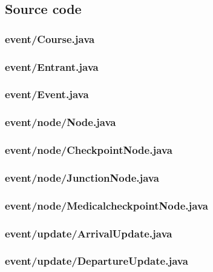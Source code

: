 \documentclass[a4paper, twoside]{article}
\begin{document}
\subsection{Source code}
\subsubsection{event/Course.java}

\subsubsection{event/Entrant.java}

\subsubsection{event/Event.java}

\subsubsection{event/node/Node.java}

\subsubsection{event/node/CheckpointNode.java}

\subsubsection{event/node/JunctionNode.java}

\subsubsection{event/node/MedicalcheckpointNode.java}

\subsubsection{event/update/ArrivalUpdate.java}

\subsubsection{event/update/DepartureUpdate.java}

\end{document}
